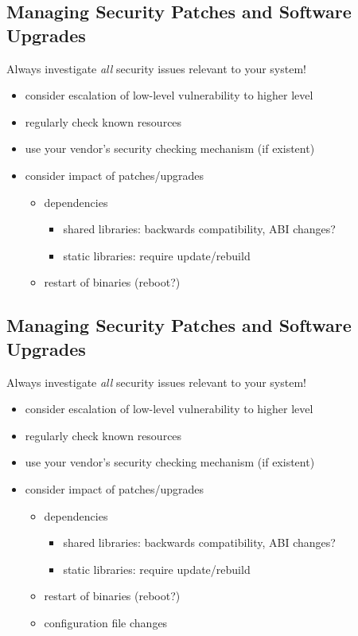 \documentclass[xga]{xdvislides}
\begin{document}
\subsection{Managing Security Patches and Software Upgrades}
Always investigate {\em all} security issues relevant to your system!
\begin{itemize}
	\item consider escalation of low-level vulnerability to higher level
	\item regularly check known resources
	\item use your vendor's security checking mechanism (if existent)
	\item consider impact of patches/upgrades
		\begin{itemize}
			\item dependencies
				\begin{itemize}
					\item shared libraries:  backwards compatibility, ABI
						changes?
					\item static libraries:  require update/rebuild
				\end{itemize}
			\item restart of binaries (reboot?)
		\end{itemize}
\end{itemize}

\subsection{Managing Security Patches and Software Upgrades}
Always investigate {\em all} security issues relevant to your system!
\begin{itemize}
	\item consider escalation of low-level vulnerability to higher level
	\item regularly check known resources
	\item use your vendor's security checking mechanism (if existent)
	\item consider impact of patches/upgrades
		\begin{itemize}
			\item dependencies
				\begin{itemize}
					\item shared libraries:  backwards compatibility, ABI
						changes?
					\item static libraries:  require update/rebuild
				\end{itemize}
			\item restart of binaries (reboot?)
			\item configuration file changes
		\end{itemize}
\end{itemize}
\end{document}
